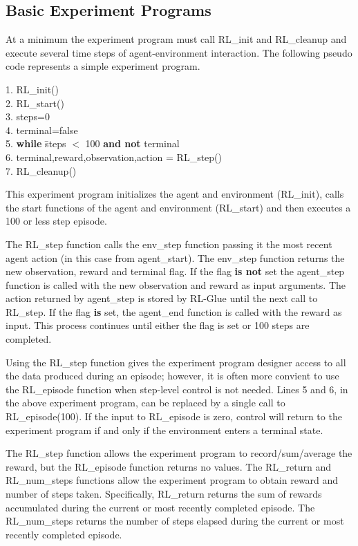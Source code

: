 \documentclass[11pt]{article}
\begin{document}
\subsection{Basic Experiment Programs}
\label{expp1}

At a minimum the experiment program must call RL\_init and RL\_cleanup and execute several time steps of agent-environment interaction. The following pseudo code represents a simple experiment program.
\begin{tabbing}
1. RL\_init()\\
2. RL\_start()\\
3. steps=0\\  
4. terminal=false \\
5. {\bf while} \=steps $<$ 100 {\bf and not} terminal\\
6.\> terminal,reward,observation,action = RL\_step()\\
7. RL\_cleanup()
\end{tabbing}
This experiment program initializes the agent and environment (RL\_init), calls the start functions of the agent and environment (RL\_start) and then executes a 100 or less step episode. 

The RL\_step function calls the env\_step function passing it the most recent agent action (in this case from agent\_start). The env\_step function returns the new observation, reward and terminal flag. If the flag {\bf is not} set the agent\_step function is called with the new observation and reward as input arguments. The action returned by agent\_step is stored by RL-Glue until the next call to RL\_step. If the flag {\bf is} set, the agent\_end function is called with the reward as input. This process continues until either the flag is set or 100 steps are completed. 

Using the RL\_step function gives the experiment program designer access to all the data produced during an episode; however, it is often more convient to use the RL\_episode function when step-level control is not needed. Lines 5 and 6, in the above experiment program, can be replaced by a single call to RL\_episode(100). If the input to RL\_episode is zero, control will return to the experiment program if and only if the environment enters a terminal state.

The RL\_step function allows the experiment program to record/sum/average the reward, but the RL\_episode function returns no values. The RL\_return and RL\_num\_steps functions allow the experiment program to obtain reward and number of steps taken. Specifically, RL\_return returns the sum of rewards accumulated during the current or most recently completed episode. The RL\_num\_steps returns the number of steps elapsed during the current or most recently completed episode. 
\end{document}
